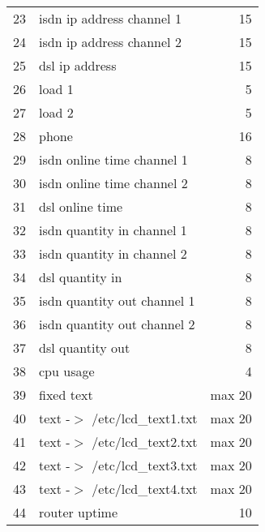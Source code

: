 \begin{description}
\begin{table}[htbp]
\begin{small}
\begin{center}
\begin{tabular}{rlr}
                23 &      isdn ip address channel 1       & 15 \\
                24 &      isdn ip address channel 2       & 15 \\
                25 &      dsl ip address                  & 15 \\

                26 &      load 1                          &  5 \\
                27 &      load 2                          &  5 \\

                28 &      phone                           & 16 \\

                29 &      isdn online time channel 1      &  8 \\
                30 &      isdn online time channel 2      &  8 \\
                31 &      dsl online time                 &  8 \\

                32 &      isdn quantity in channel 1      &  8 \\
                33 &      isdn quantity in channel 2      &  8 \\
                34 &      dsl quantity in                 &  8 \\

                35 &      isdn quantity out channel 1     &  8 \\
                36 &      isdn quantity out channel 2     &  8 \\
                37 &      dsl quantity out                &  8 \\

                38 &      cpu usage                       &  4 \\

                39 &      fixed text                  & max 20 \\
                40 &      text -$>$ /etc/lcd\_text1.txt  & max 20 \\
                41 &      text -$>$ /etc/lcd\_text2.txt  & max 20 \\
                42 &      text -$>$ /etc/lcd\_text3.txt  & max 20 \\
                43 &      text -$>$ /etc/lcd\_text4.txt  & max 20 \\

                44 &      router uptime                   & 10 \\


\end{tabular}
\end{center}
\end{small}
\end{table}
\end{description}
